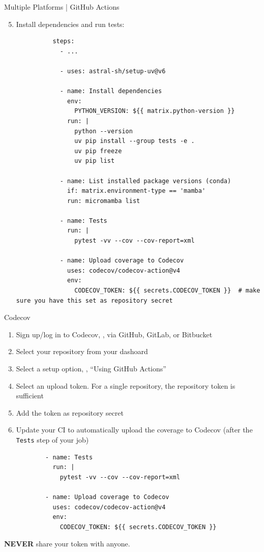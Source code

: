 \begin{darkframe}[fragile]{
    Multiple Platforms | GitHub Actions
  }
  \begin{enumerate}
    \setcounter{enumi}{4}
    \item Install dependencies and run tests:
        \footnotesize
        \begin{verbatim}
          steps:
            - ...

            - uses: astral-sh/setup-uv@v6

            - name: Install dependencies
              env:
                PYTHON_VERSION: ${{ matrix.python-version }}
              run: |
                python --version
                uv pip install --group tests -e .
                uv pip freeze
                uv pip list

            - name: List installed package versions (conda)
              if: matrix.environment-type == 'mamba'
              run: micromamba list

            - name: Tests
              run: |
                pytest -vv --cov --cov-report=xml

            - name: Upload coverage to Codecov
              uses: codecov/codecov-action@v4
              env:
                CODECOV_TOKEN: ${{ secrets.CODECOV_TOKEN }}  # make sure you have this set as repository secret
        \end{verbatim}
  \end{enumerate}
\end{darkframe}


\begin{darkframe}[fragile]{Codecov}
  \begin{enumerate}
    \item Sign up/log in to Codecov, \eg, via GitHub, GitLab, or Bitbucket
    \item Select your repository from your dashoard
    \item Select a setup option, \eg, \enquote{Using GitHub Actions}
    \item Select an upload token. For a single repository, the repository
      token is sufficient
    \item Add the token as repository secret
    \item Update your CI to automatically upload the coverage to Codecov (after the \texttt{Tests} step of your job)
      \begin{verbatim}
        - name: Tests
          run: |
            pytest -vv --cov --cov-report=xml

        - name: Upload coverage to Codecov
          uses: codecov/codecov-action@v4
          env:
            CODECOV_TOKEN: ${{ secrets.CODECOV_TOKEN }}
      \end{verbatim}
  \end{enumerate}
  \vspace{0.25em}
  \begin{center}
    \huge\textcolor{cpink}{\to{} \textbf{NEVER} share your token with anyone.}
  \end{center}
\end{darkframe}


